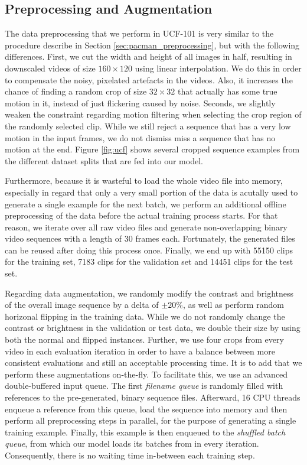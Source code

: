 \subsection{Preprocessing and Augmentation}

The data preprocessing that we perform in UCF-101 is very similar to the procedure describe in Section \ref{sec:pacman_preprocessing}, but with the following differences. First, we cut the width and height of all images in half, resulting in downscaled videos of size $160 \times 120$ using linear interpolation. We do this in order to compensate the noisy, pixelated artefacts in the videos. Also, it increases the chance of finding a random crop of size $ 32 \times 32 $ that actually has some true motion in it, instead of just flickering caused by noise. Seconds, we slightly weaken the constraint regarding motion filtering when selecting the crop region of the randomly selected clip. While we still reject a sequence that has a very low motion in the input frames, we do not dismiss miss a sequence that has no motion at the end. Figure \ref{fig:ucf} shows several cropped sequence examples from the different dataset splits that are fed into our model.

Furthermore, because it is wasteful to load the whole video file into memory, especially in regard that only a very small portion of the data is acutally used to generate a single example for the next batch, we perform an additional offline preprocessing of the data before the actual training process starts. For that reason, we iterate over all raw video files and generate non-overlapping binary video sequences with a length of \num{30} frames each. Fortunately, the generated files can be reused after doing this process once. Finally, we end up with \num{55150} clips for the training set, \num{7183} clips for the validation set and \num{14451} clips for the test set.

Regarding data augmentation, we randomly modify the contrast and brightness of the overall image sequence by a delta of $ \pm20\% $, as well as perform random horizonal flipping in the training data. While we do not randomly change the contrast or brightness in the validation or test data, we double their size by using both the normal and flipped instances. Further, we use four crops from every video in each evaluation iteration in order to have a balance between more consistent evaluations and still an acceptable processing time. It is to add that we perform these augmentations on-the-fly. To facilitate this, we use an advanced double-buffered input queue. The first \textit{filename queue} is randomly filled with references to the pre-generated, binary sequence files. Afterward, \num{16} CPU threads enqueue a reference from this queue, load the sequence into memory and then perform all preprocessing steps in parallel, for the purpose of generating a single training example. Finally, this example is then enqueued to the \textit{shuffled batch queue}, from which our model loads its batches from in every iteration. Consequently, there is no waiting time in-between each training step.


